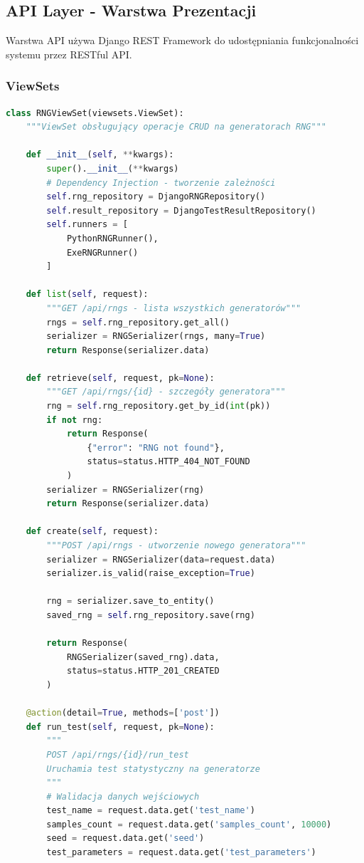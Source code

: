 \documentclass[12pt,a4paper]{article}
\begin{document}
\newpage

\subsection{API Layer - Warstwa Prezentacji}

Warstwa API używa Django REST Framework do udostępniania funkcjonalności systemu przez RESTful API.

\subsubsection{ViewSets}

\begin{lstlisting}[language=Python, caption=RNGViewSet - główny endpoint dla RNG]
class RNGViewSet(viewsets.ViewSet):
    """ViewSet obsługujący operacje CRUD na generatorach RNG"""

    def __init__(self, **kwargs):
        super().__init__(**kwargs)
        # Dependency Injection - tworzenie zależności
        self.rng_repository = DjangoRNGRepository()
        self.result_repository = DjangoTestResultRepository()
        self.runners = [
            PythonRNGRunner(),
            ExeRNGRunner()
        ]

    def list(self, request):
        """GET /api/rngs - lista wszystkich generatorów"""
        rngs = self.rng_repository.get_all()
        serializer = RNGSerializer(rngs, many=True)
        return Response(serializer.data)

    def retrieve(self, request, pk=None):
        """GET /api/rngs/{id} - szczegóły generatora"""
        rng = self.rng_repository.get_by_id(int(pk))
        if not rng:
            return Response(
                {"error": "RNG not found"},
                status=status.HTTP_404_NOT_FOUND
            )
        serializer = RNGSerializer(rng)
        return Response(serializer.data)

    def create(self, request):
        """POST /api/rngs - utworzenie nowego generatora"""
        serializer = RNGSerializer(data=request.data)
        serializer.is_valid(raise_exception=True)

        rng = serializer.save_to_entity()
        saved_rng = self.rng_repository.save(rng)

        return Response(
            RNGSerializer(saved_rng).data,
            status=status.HTTP_201_CREATED
        )

    @action(detail=True, methods=['post'])
    def run_test(self, request, pk=None):
        """
        POST /api/rngs/{id}/run_test
        Uruchamia test statystyczny na generatorze
        """
        # Walidacja danych wejściowych
        test_name = request.data.get('test_name')
        samples_count = request.data.get('samples_count', 10000)
        seed = request.data.get('seed')
        test_parameters = request.data.get('test_parameters')


\end{lstlisting}
\end{document}
